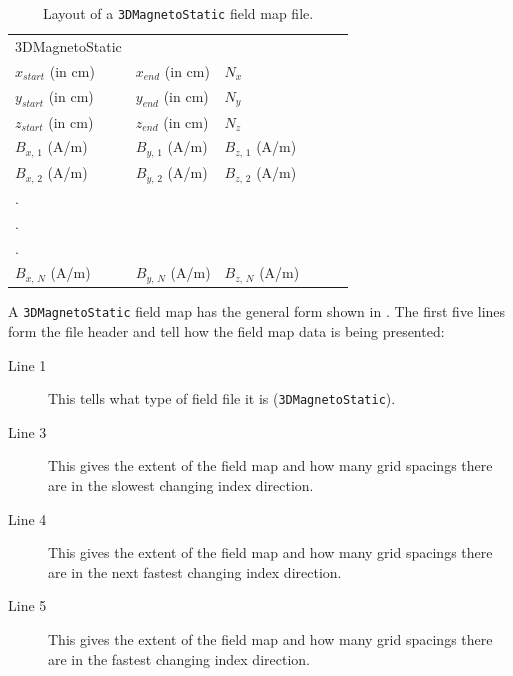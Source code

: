 \begin{table}[h!]
    \caption{Layout of a \texttt{3DMagnetoStatic} field map file.}
    \label{tab:3DMagnetoStatic}
    \begin{center}
    \begin{tabular}{llllll}
      \hline
      3DMagnetoStatic     &                   &                   \\
      $x_{start}$ (in cm) & $x_{end}$ (in cm) & $N_{x}$           \\
      $y_{start}$ (in cm) & $y_{end}$ (in cm) & $N_{y}$           \\
      $z_{start}$ (in cm) & $z_{end}$ (in cm) & $N_{z}$           \\
      $B_{x,\,1}$ (A/m)   & $B_{y,\,1}$ (A/m) & $B_{z,\,1}$ (A/m) \\
      $B_{x,\,2}$ (A/m)   & $B_{y,\,2}$ (A/m) & $B_{z,\,2}$ (A/m) \\
      .                   &                   &                   \\
      .                   &                   &                   \\
      .                   &                   &                   \\
      $B_{x,\,N}$ (A/m)   & $B_{y,\,N}$ (A/m) & $B_{z,\,N}$ (A/m) \\
      \hline
    \end{tabular}
    \end{center}
\end{table}

A \texttt{3DMagnetoStatic} field map has the general form shown in . The first five lines form
the file header and tell \opalt how the field map data is being presented:

\begin{description}
\item[Line 1] This tells \opalt what type of field file it is (\texttt{3DMagnetoStatic}).
\item[Line 3] This gives the extent of the field map and how many grid spacings there are in the slowest changing
  index direction.
\item[Line 4] This gives the extent of the field map and how many grid spacings there are in the next fastest changing
  index direction.
\item[Line 5] This gives the extent of the field map and how many grid spacings there are in the fastest changing
  index direction.
\end{description}

